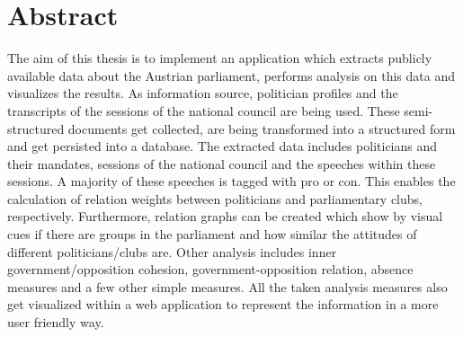 

\chapter*{Abstract}

The aim of this thesis is to implement an application which extracts publicly available data about the Austrian parliament, performs analysis on this data and visualizes the results. As information source, politician profiles and the transcripts of the sessions of the national council are being used. These semi-structured documents get collected, are being transformed into a structured form and get persisted into a database. The extracted data includes politicians and their mandates, sessions of the national council and the speeches within these sessions. A majority of these speeches is tagged with pro or con. This enables the calculation of relation weights between politicians and parliamentary clubs, respectively. Furthermore, relation graphs can be created which show by visual cues if there are groups in the parliament and how similar the attitudes of different politicians/clubs are. Other analysis includes inner government/opposition cohesion, government-opposition relation, absence measures and a few other simple measures. All the taken analysis measures also get visualized within a web application to represent the information in a more user friendly way.